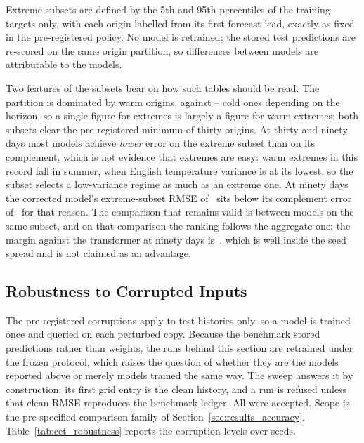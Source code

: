 Extreme subsets are defined by the 5th and 95th percentiles of the training targets only, with each origin labelled from its first forecast lead, exactly as fixed in the pre-registered policy. No model is retrained; the stored test predictions are re-scored on the same origin partition, so differences between models are attributable to the models.


Two features of the subsets bear on how such tables should be read. The partition is dominated by warm origins, \extremeWarmCount{} against \extremeColdLow{}--\extremeColdHigh{} cold ones depending on the horizon, so a single figure for extremes is largely a figure for warm extremes; both subsets clear the pre-registered minimum of thirty origins. At thirty and ninety days most models achieve \emph{lower} error on the extreme subset than on its complement, which is not evidence that extremes are easy: warm extremes in this record fall in summer, when English temperature variance is at its lowest, so the subset selects a low-variance regime as much as an extreme one. At ninety days the corrected model's extreme-subset RMSE of \extremeTrustNinety{}\,\degC{} sits below its complement error of \extremeComplementNinety{}\,\degC{} for that reason. The comparison that remains valid is between models on the same subset, and on that comparison the ranking follows the aggregate one; the margin against the transformer at ninety days is \extremeGapNinety{}\,\degC{}, which is well inside the seed spread and is not claimed as an advantage.

\subsection{Robustness to Corrupted Inputs}
\label{sec:results_robustness}

The pre-registered corruptions apply to test histories only, so a model is trained once and queried on each perturbed copy. Because the benchmark stored predictions rather than weights, the \robustRuns{} runs behind this section are retrained under the frozen protocol, which raises the question of whether they are the models reported above or merely models trained the same way. The sweep answers it by construction: its first grid entry is the clean history, and a run is refused unless that clean RMSE reproduces the benchmark ledger. All \robustRuns{} were accepted. Scope is the pre-specified comparison family of Section~\ref{sec:results_accuracy}. Table~\ref{tab:cet_robustness} reports the \robustLevels{} corruption levels over \robustSeeds{} seeds.

